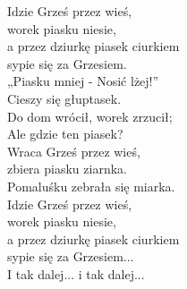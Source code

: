 \documentclass[12pt,b5paper]{article}
\begin{document}
	\begin{flushright}
		Idzie Grześ przez wieś, \\
		worek piasku niesie, \\
		a przez dziurkę piasek ciurkiem \\
		sypie się za Grzesiem.\\
		„Piasku mniej - Nosić lżej!” \\
		Cieszy się głuptasek. \\
		Do dom wrócił, worek zrzucił; \\
		Ale gdzie ten piasek? \\
		Wraca Grześ przez wieś, \\
		zbiera piasku ziarnka. \\
		Pomaluśku zebrała się miarka. \\
		Idzie Grześ przez wieś, \\
		worek piasku niesie, \\
		a przez dziurkę piasek ciurkiem \\
		sypie się za Grzesiem... \\
		I tak dalej... i tak dalej... \\
	\end{flushright}
\end{document}
